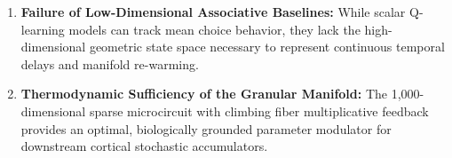 \documentclass[11pt,twoside,a4paper]{article}
\begin{document}
\begin{enumerate}
    \item \textbf{Failure of Low-Dimensional Associative Baselines:}
    While scalar Q-learning models can track mean choice behavior, they lack the high-dimensional geometric state space necessary to represent continuous temporal delays and manifold re-warming.
    
    \item \textbf{Thermodynamic Sufficiency of the Granular Manifold:}
    The 1,000-dimensional sparse microcircuit with climbing fiber multiplicative feedback provides an optimal, biologically grounded parameter modulator for downstream cortical stochastic accumulators.
\end{enumerate}
\end{document}
